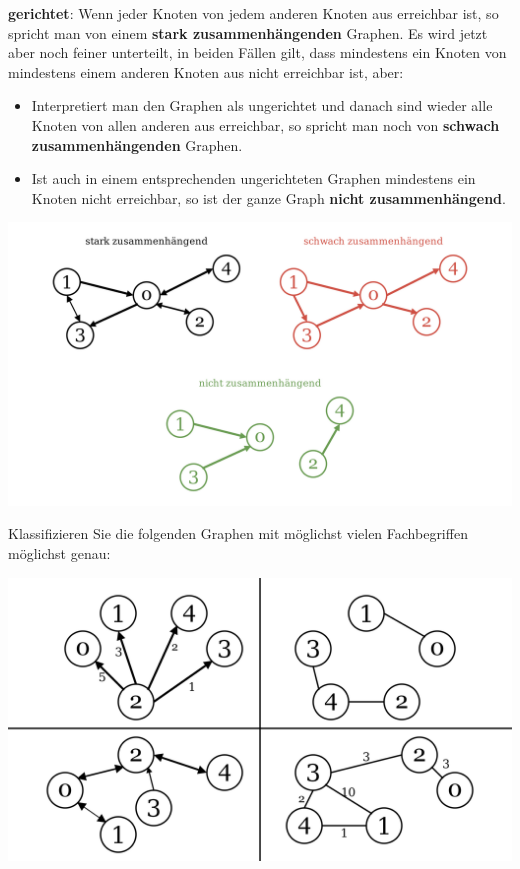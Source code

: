 \documentclass{article}
\begin{document}
\begin{enumerate}
\begin{center}
    \end{center}
    \textbf{gerichtet}: Wenn jeder Knoten von jedem anderen Knoten aus erreichbar ist, so spricht man von einem \textbf{stark zusammenhängenden} Graphen. Es wird jetzt aber noch feiner unterteilt, in beiden Fällen gilt, dass mindestens ein Knoten von mindestens einem anderen Knoten aus nicht erreichbar ist, aber:
    \begin{itemize}
        \item Interpretiert man den Graphen als ungerichtet und danach sind wieder alle Knoten von allen anderen aus erreichbar, so spricht man noch von \textbf{schwach zusammenhängenden} Graphen. 
        \item Ist auch in einem entsprechenden ungerichteten Graphen mindestens ein Knoten nicht erreichbar, so ist der ganze Graph \textbf{nicht zusammenhängend}.
    \end{itemize}
    \begin{center}
        \includegraphics[scale=0.15]{../../media/gerichtet_zusammenhang.png}
    \end{center}
\end{enumerate}

\begin{task}{1}
    Klassifizieren Sie die folgenden Graphen mit möglichst vielen Fachbegriffen möglichst genau:
    \begin{center}
        \includegraphics[scale=0.2]{../../media/graphs_task.png}
    \end{center}
\end{task}
\end{document}
